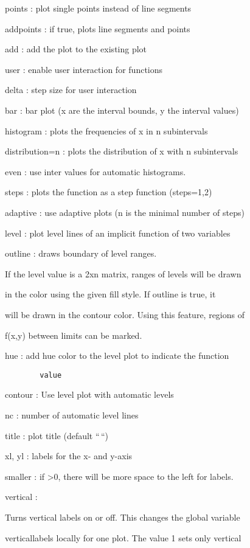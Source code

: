 \documentclass[
]{book}
\begin{document}
points : plot single points instead of line segments

addpoints : if true, plots line segments and points

add : add the plot to the existing plot

user : enable user interaction for functions

delta : step size for user interaction

bar : bar plot (x are the interval bounds, y the interval values)

histogram : plots the frequencies of x in n subintervals

distribution=n : plots the distribution of x with n subintervals

even : use inter values for automatic histograms.

steps : plots the function as a step function (steps=1,2)

adaptive : use adaptive plots (n is the minimal number of steps)

level : plot level lines of an implicit function of two variables

outline : draws boundary of level ranges.

If the level value is a 2xn matrix, ranges of levels will be drawn

in the color using the given fill style. If outline is true, it

will be drawn in the contour color. Using this feature, regions of

f(x,y) between limits can be marked.

hue : add hue color to the level plot to indicate the function

\begin{verbatim}
        value
\end{verbatim}

contour : Use level plot with automatic levels

nc : number of automatic level lines

title : plot title (default ``\,``)

xl, yl : labels for the x- and y-axis

smaller : if \textgreater0, there will be more space to the left for labels.

vertical :

Turns vertical labels on or off. This changes the global variable

verticallabels locally for one plot. The value 1 sets only vertical
\end{document}
